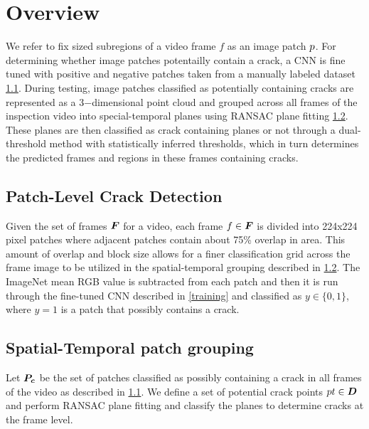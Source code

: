 

\section{Overview}
    We refer to fix sized subregions of a video frame $f$ as an image patch $p$. For determining whether image patches potentailly contain a crack, a CNN is fine tuned with positive and negative patches taken from a manually labeled dataset \ref{detection}.  During testing, image patches classified as potentially containing cracks are represented as a 3$-$dimensional point cloud and grouped across all frames of the inspection video into special-temporal planes using RANSAC plane fitting \ref{planes}. These planes are then classified as crack containing planes or not through a dual-threshold method with statistically inferred thresholds, which in turn determines the predicted frames and regions in these frames containing cracks.  


    \subsection{Patch-Level Crack Detection} \label{detection}
            Given the set of frames $\boldsymbol{F}$ for a video, each frame $f \in \boldsymbol{F}$ is divided into 224x224 pixel patches where adjacent patches contain about 75\% overlap in area. This amount of overlap and block size allows for a finer classification grid across the frame image to be utilized in the spatial-temporal grouping described in \ref{planes}. The ImageNet mean RGB value is subtracted from each patch  and then it is run through the fine-tuned CNN described in \ref{training} and classified as $y \in \{0,1\}$, where $y=1$ is a patch that possibly contains a crack.



    \subsection{Spatial-Temporal patch grouping} \label{planes}
            Let $\boldsymbol{P_c}$ be the set of patches classified as possibly containing a crack in all frames of the video as described in \ref{detection}. We define a set of potential crack points $pt \in \boldsymbol{D}$ and perform RANSAC plane fitting and classify the planes to determine cracks at the frame level.

